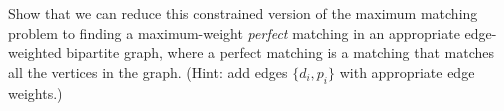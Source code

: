 \documentclass[11pt]{article}
\begin{document}
\begin{enumerate}
\begin{enumerate}
    Show that we can reduce this constrained version of the maximum matching problem to finding a maximum-weight {\em perfect} matching in an appropriate edge-weighted bipartite graph, where
    a perfect matching is a matching that matches all the vertices in the graph. (Hint: add edges $\{d_i,p_i\}$ with appropriate edge weights.) 
    \end{enumerate}

\end{enumerate}
\end{document}
